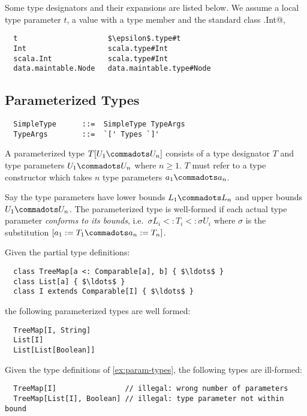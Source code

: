 \example 
Some type designators and their expansions are listed below. We assume
a local type parameter $t$, a value 
with a type member  and the standard class \lstinline@scala.Int@, 
\begin{lstlisting}
  t                     $\epsilon$.type#t
  Int                   scala.type#Int
  scala.Int             scala.type#Int
  data.maintable.Node   data.maintable.type#Node
\end{lstlisting}

\subsection{Parameterized Types}
\label{sec:param-types}

\syntax\begin{lstlisting}
  SimpleType      ::=  SimpleType TypeArgs
  TypeArgs        ::=  `[' Types `]'
\end{lstlisting}

A parameterized type $T[U_1 \commadots U_n]$ consists of a type
designator $T$ and type parameters $U_1 \commadots U_n$ where $n \geq
1$.  $T$ must refer to a type constructor which takes $n$ type
parameters $a_1 \commadots a_n$.

Say the type parameters have lower bounds $L_1 \commadots L_n$ and
upper bounds $U_1 \commadots U_n$.  The parameterized type is
well-formed if each actual type parameter {\em conforms to its
bounds}, i.e.\ $\sigma L_i <: T_i <: \sigma U_i$ where $\sigma$ is the
substitution $[a_1 := T_1 \commadots a_n := T_n]$.

\example\label{ex:param-types}
Given the partial type definitions:

\begin{lstlisting}
  class TreeMap[a <: Comparable[a], b] { $\ldots$ }
  class List[a] { $\ldots$ }
  class I extends Comparable[I] { $\ldots$ }
\end{lstlisting}

the following parameterized types are well formed:

\begin{lstlisting}
  TreeMap[I, String]
  List[I]
  List[List[Boolean]]
\end{lstlisting}

\example Given the type definitions of \ref{ex:param-types},
the following types are ill-formed:

\begin{lstlisting}
  TreeMap[I]                // illegal: wrong number of parameters
  TreeMap[List[I], Boolean] // illegal: type parameter not within bound
\end{lstlisting}

